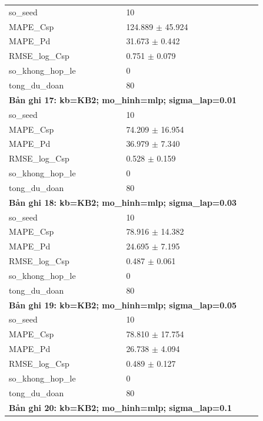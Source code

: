 \begin{longtable}{p{0.43\linewidth}p{0.50\linewidth}}
so\_\allowbreak seed & 10 \\
MAPE\_\allowbreak Csp & 124.889 $\pm$ 45.924 \\
MAPE\_\allowbreak Pd & 31.673 $\pm$ 0.442 \\
RMSE\_\allowbreak log\_\allowbreak Csp & 0.751 $\pm$ 0.079 \\
so\_\allowbreak khong\_\allowbreak hop\_\allowbreak le & 0 \\
tong\_\allowbreak du\_\allowbreak doan & 80 \\
\midrule
\multicolumn{2}{p{0.95\linewidth}}{\textbf{Bản ghi 17: kb=KB2; mo\_hinh=mlp; sigma\_lap=0.01}} \\
so\_\allowbreak seed & 10 \\
MAPE\_\allowbreak Csp & 74.209 $\pm$ 16.954 \\
MAPE\_\allowbreak Pd & 36.979 $\pm$ 7.340 \\
RMSE\_\allowbreak log\_\allowbreak Csp & 0.528 $\pm$ 0.159 \\
so\_\allowbreak khong\_\allowbreak hop\_\allowbreak le & 0 \\
tong\_\allowbreak du\_\allowbreak doan & 80 \\
\midrule
\multicolumn{2}{p{0.95\linewidth}}{\textbf{Bản ghi 18: kb=KB2; mo\_hinh=mlp; sigma\_lap=0.03}} \\
so\_\allowbreak seed & 10 \\
MAPE\_\allowbreak Csp & 78.916 $\pm$ 14.382 \\
MAPE\_\allowbreak Pd & 24.695 $\pm$ 7.195 \\
RMSE\_\allowbreak log\_\allowbreak Csp & 0.487 $\pm$ 0.061 \\
so\_\allowbreak khong\_\allowbreak hop\_\allowbreak le & 0 \\
tong\_\allowbreak du\_\allowbreak doan & 80 \\
\midrule
\multicolumn{2}{p{0.95\linewidth}}{\textbf{Bản ghi 19: kb=KB2; mo\_hinh=mlp; sigma\_lap=0.05}} \\
so\_\allowbreak seed & 10 \\
MAPE\_\allowbreak Csp & 78.810 $\pm$ 17.754 \\
MAPE\_\allowbreak Pd & 26.738 $\pm$ 4.094 \\
RMSE\_\allowbreak log\_\allowbreak Csp & 0.489 $\pm$ 0.127 \\
so\_\allowbreak khong\_\allowbreak hop\_\allowbreak le & 0 \\
tong\_\allowbreak du\_\allowbreak doan & 80 \\
\midrule
\multicolumn{2}{p{0.95\linewidth}}{\textbf{Bản ghi 20: kb=KB2; mo\_hinh=mlp; sigma\_lap=0.1}} \\

\end{longtable}
